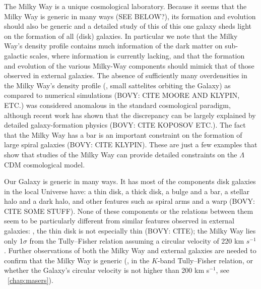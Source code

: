 The Milky Way is a unique cosmological laboratory. Because it seems
that the Milky Way is generic in many ways (SEE BELOW?), its formation
and evolution should also be generic and a detailed study of this of
this one galaxy sheds light on the formation of all (disk)
galaxies. In particular we note that the Milky Way's density profile
contains much information of the dark matter on sub-galactic scales,
where information is currently lacking, and that the formation and
evolution of the various Milky-Way components should mimick that of
those observed in external galaxies. The absence of sufficiently many
overdensities in the Milky Way's density profile (\ie, small
sattelites orbiting the Galaxy) as compared to numerical simulations
(BOVY: CITE MOORE AND KLYPIN, ETC.) was considered anomalous in the
standard cosmological paradigm, although recent work has shown that
the discrepancy can be largely explained by detailed galaxy-formation
physics (BOVY: CITE KOPOSOV ETC.). The fact that the Milky Way has a
bar is an important constraint on the formation of large spiral
galaxies (BOVY: CITE KLYPIN). These are just a few examples that show
that studies of the Milky Way can provide detailed constraints on the
$\Lambda$CDM cosmological model.

Our Galaxy is generic in many ways. It has most of the components disk
galaxies in the local Universe have: a thin disk, a thick disk, a
bulge and a bar, a stellar halo and a dark halo, and other features
such as spiral arms and a warp (BOVY: CITE SOME STUFF). None of these
components or the relations between them seem to be particularly
different from similar features observed in external galaxies: \eg,
the thin disk is not especially thin (BOVY: CITE); the Milky Way lies
only 1$\sigma$ from the Tully--Fisher relation assuming a circular
velocity of 220 km $s^{-1}$ \citep{Flynn06a}. Further observations of
both the Milky Way and external galaxies are needed to confirm that
the Milky Way is generic (\eg, in the $K$-band Tully--Fisher relation,
or whether the Galaxy's circular velocity is not higher than 200 km
s$^{-1}$, see \chaptername~\ref{chap:masers}). 

